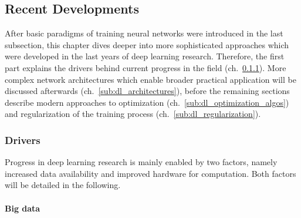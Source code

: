 \subsection{Recent Developments}
\label{sub:dl_developments}

After basic paradigms of training neural networks were introduced in the last
subsection, this chapter dives deeper into more sophisticated approaches
which were developed in the last years of deep learning research.
Therefore, the first part explains the drivers behind current progress in the
field (ch.~\ref{sub:dl_drivers}). More complex network architectures which enable
broader practical application will be discussed afterwards (ch.~\ref{sub:dl_architectures}),
before the remaining sections describe modern approaches to optimization
(ch.~\ref{sub:dl_optimization_algos}) and regularization of the training process
(ch.~\ref{sub:dl_regularization}).

\subsubsection{Drivers}
\label{sub:dl_drivers}

Progress in deep learning research is mainly enabled by two factors, namely
increased data availability and improved hardware for computation.
Both factors will be detailed in the following.

\paragraph{Big data}

